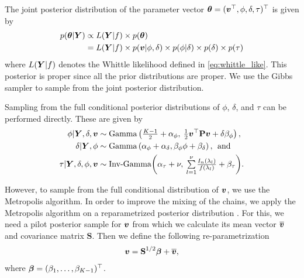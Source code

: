 \documentclass[twocolumn,final]{svjour3}
\newcommand{\bm}[1]{\mbox{\boldmath $#1$}}
\begin{document}
The  joint posterior distribution of the parameter vector $\bm{\theta} = (\bm{v}^\top, \phi, \delta, \tau)^\top$ is given by
\begin{align*}
p(\bm{\theta}|\bm{Y}) & \propto L(\bm{Y}|f) \times p(\bm{\theta})  \\
&= L(\bm{Y}|f) \times p(\bm{v}|\phi, \delta) \times p(\phi|\delta) \times p(\delta) \times p(\tau)
\end{align*}
where $ L(\bm{Y}|f) $ denotes the Whittle likelihood defined in \eqref{eq:whittle_like}.
This posterior is proper since all the prior distributions are proper.  
We use the Gibbs sampler to sample from the joint posterior distribution.

Sampling from the full conditional posterior distributions of $\phi$, $\delta$, and $\tau$ can be performed directly. These are given by
\begin{align*}
\phi|\bm{Y},\delta,\bm{v} &\sim \text{Gamma}\left(\tfrac{K-1}{2} + \alpha_{\phi},\: \tfrac{1}{2} \bm{v}^\top \textbf{P} \bm{v} + \delta \beta_{\phi} \right), \\
\delta|\bm{Y},\phi  &\sim \text{Gamma}\left(\alpha_{\phi} + \alpha_{\delta}, \beta_{\phi} \phi + \beta_{\delta}\right),\:\: \text{and}\\
\tau|\bm{Y},\delta, \phi,\bm{v}   &\sim \text{Inv-Gamma}\!\left(\alpha_{\tau}+ \nu,\:  {\textstyle\sum\limits_{l=1}^{\nu}} \tfrac{I_n(\lambda_l)}{f(\lambda_l)} + \beta_{\tau} \right)\!.
\end{align*}

However, to sample from the full conditional distribution of $\bm{v}$, we use the Metropolis algorithm.
In order to improve the mixing of the chains, we apply the Metropolis algorithm on a reparametrized posterior distribution \citep{Lambert:2007}.  For this, we need a pilot posterior sample for $\bm{v}$ from which we calculate its mean vector $\bm{\overline{v}}$ and covariance matrix $\textbf{S}$.  Then we define the following re-parametrization
\begin{align*}
\bm{v} = \textbf{S}^{1/2} \bm{\beta} + \overline{\bm{v}},
\end{align*}
where $\bm{\beta}=(\beta_1, \dots, \beta_{K-1})^\top$.
\end{document}
